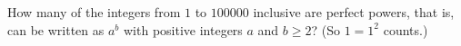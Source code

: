 How many of the integers from $1$ to $100000$ inclusive are perfect powers, that is, can be written as $a^b$ with positive integers $a$ and $b\ge2$? (So $1=1^2$ counts.)
